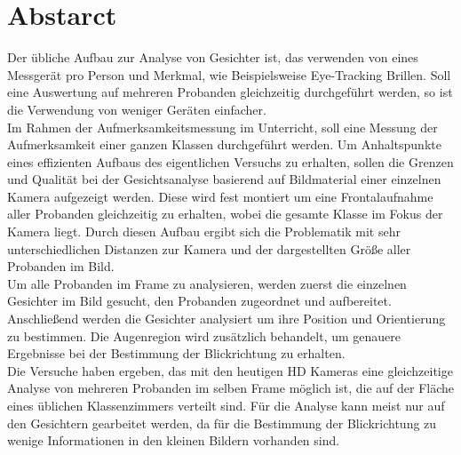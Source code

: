 \section{Abstarct}
Der übliche Aufbau zur Analyse von Gesichter ist, das verwenden von eines Messgerät pro Person und Merkmal, wie Beispielsweise Eye-Tracking Brillen. Soll eine Auswertung auf mehreren Probanden gleichzeitig durchgeführt werden, so ist die Verwendung von weniger Geräten einfacher.\\
Im Rahmen der Aufmerksamkeitsmessung im Unterricht, soll eine Messung der Aufmerksamkeit einer ganzen Klassen durchgeführt werden. Um Anhaltspunkte eines effizienten Aufbaus des eigentlichen Versuchs zu erhalten, sollen die Grenzen und Qualität bei der Gesichtsanalyse basierend auf Bildmaterial einer einzelnen Kamera aufgezeigt werden. Diese wird fest montiert um eine Frontalaufnahme aller Probanden gleichzeitig zu erhalten, wobei die gesamte Klasse im Fokus der Kamera liegt. Durch diesen Aufbau ergibt sich die Problematik mit sehr unterschiedlichen Distanzen zur Kamera und der dargestellten Größe aller Probanden im Bild.\\
Um alle Probanden im Frame zu analysieren, werden zuerst die einzelnen Gesichter im Bild gesucht, den Probanden zugeordnet und aufbereitet. Anschließend werden die Gesichter analysiert um ihre Position und Orientierung zu bestimmen. Die Augenregion wird zusätzlich behandelt, um genauere Ergebnisse bei der Bestimmung der Blickrichtung zu erhalten.\\
Die Versuche haben ergeben, das mit den heutigen HD Kameras eine gleichzeitige Analyse von mehreren Probanden im selben Frame möglich ist, die auf der Fläche eines üblichen Klassenzimmers verteilt sind. Für die Analyse kann meist nur auf den Gesichtern gearbeitet werden, da für die Bestimmung der Blickrichtung zu wenige Informationen in den kleinen Bildern vorhanden sind.